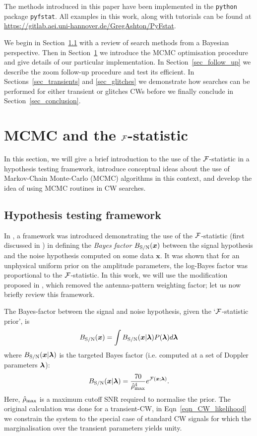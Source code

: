 \documentclass[aps, prd, twocolumn, superscriptaddress, floatfix, showpacs, nofootinbib, longbibliography]{revtex4-1}
\begin{document}
The methods introduced in this paper have been implemented in the
\texttt{python} package \texttt{pyfstat}. All examples in this work, along with
tutorials can be found at
\url{https://gitlab.aei.uni-hannover.de/GregAshton/PyFstat}.

We begin in Section~\ref{sec_hypothesis_testing} with a review of search
methods from a Bayesian perspective. Then in
Section~\ref{sec_MCMC_and_the_F_statistic} we introduce the MCMC optimisation
procedure and give details of our particular implementation. In
Section~\ref{sec_follow_up} we describe the zoom follow-up procedure and test
its efficient. In Sections~\ref{sec_transients} and \ref{sec_glitches} we
demonstrate how searches can be performed for either transient or glitches CWs
before we finally conclude in Section~\ref{sec_conclusion}.

\section{MCMC and the ${\mathcal{F}}$-statistic}
\label{sec_MCMC_and_the_F_statistic}

In this section, we will give a brief introduction to the use of the
${\mathcal{F}}$-statistic in a hypothesis testing framework, introduce conceptual ideas
about the use of Markov-Chain Monte-Carlo (MCMC) algorithms in this context,
and develop the idea of using MCMC routines in CW searches.

\subsection{Hypothesis testing framework}
\label{sec_hypothesis_testing}

In \citet{prix2009}, a framework was introduced demonstrating the use of the
${\mathcal{F}}$-statistic (first discussed in \citet{jks1998}) in defining the \emph{Bayes
factor} $B_{\rm S/N}(\boldsymbol{x})$ between the signal hypothesis and the noise
hypothesis computed on some data $\boldsymbol{x}$.  It was shown that for an
unphysical uniform prior on the amplitude parameters, the log-Bayes factor was
proportional to the ${\mathcal{F}}$-statistic. In this work, we will use the modification
proposed in \citet{prix2011}, which removed the antenna-pattern weighting
factor; let us now briefly review this framework.

The Bayes-factor between the signal and noise hypothesis, given the
`${\mathcal{F}}$-statistic prior', is
\begin{equation}
B_{\rm S/N}(\boldsymbol{x}) = \int B_{\rm S/N}(\boldsymbol{x}| \boldsymbol{\mathbf{\lambda}})P(\boldsymbol{\mathbf{\lambda}}) d\boldsymbol{\mathbf{\lambda}}
\label{eqn_Bsn_x}
\end{equation}
where $B_{\rm S/N}(\boldsymbol{x}| \boldsymbol{\mathbf{\lambda}})$ is the
targeted Bayes factor (i.e. computed at a set of
Doppler parameters $\boldsymbol{\mathbf{\lambda}}$):
\begin{equation}
B_{\rm S/N}(\boldsymbol{x}|\boldsymbol{\mathbf{\lambda}}) = \frac{70}{\hat{\rho}_{\mathrm{max}}^{4}}
e^{{\mathcal{F}}(\boldsymbol{x}; \boldsymbol{\mathbf{\lambda}})}.
\label{eqn_CW_likelihood}
\end{equation}
Here, $\hat{\rho}_{\mathrm{max}}$ is a maximum cutoff SNR required to normalise the prior.
The original calculation was done for a transient-CW, in Eqn~\eqref{eqn_CW_likelihood}
we constrain the system to the special case of standard CW signals for which the
marginalisation over the transient parameters yields unity.
\end{document}
